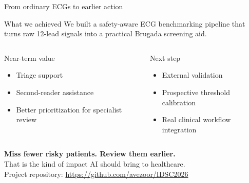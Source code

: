 \documentclass[11pt,aspectratio=169]{beamer}
\begin{document}
\begin{frame}[t]{From ordinary ECGs to earlier action}
\begin{block}{What we achieved}
We built a safety-aware ECG benchmarking pipeline that turns raw 12-lead signals into a practical Brugada screening aid.
\end{block}

\begin{columns}[T,onlytextwidth]
\begin{exampleblock}{Near-term value}
\begin{itemize}
  \item Triage support
  \item Second-reader assistance
  \item Better prioritization for specialist review
\end{itemize}
\end{exampleblock}

\begin{alertblock}{Next step}
\begin{itemize}
  \item External validation
  \item Prospective threshold calibration
  \item Real clinical workflow integration
\end{itemize}
\end{alertblock}
\end{columns}

\vspace{0.6em}
\centering
\Large\textbf{Miss fewer risky patients. Review them earlier.}\\[0.2em]
\large That is the kind of impact AI should bring to healthcare.\\[0.6em]
\scriptsize Project repository: \url{https://github.com/avezoor/IDSC2026}
\end{frame}
\end{document}
